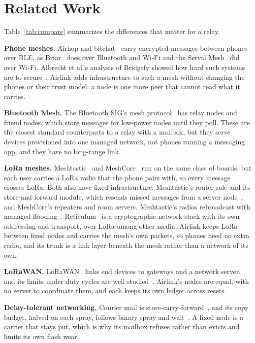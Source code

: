 \documentclass[conference]{IEEEtran}
\begin{document}
\section{Related Work}
\label{sec:related}

Table~\ref{tab:compare} summarizes the differences that matter for a relay.

\textbf{Phone meshes.} Airhop and bitchat~\cite{airhopwp,bitchat} carry encrypted messages between phones over BLE, as Briar~\cite{briar} does over Bluetooth and Wi-Fi and the Serval Mesh~\cite{serval} did over Wi-Fi. Albrecht et al.'s analysis of Bridgefy showed how hard such systems are to secure~\cite{bridgefy}. Airlink adds infrastructure to such a mesh without changing the phones or their trust model: a node is one more peer that cannot read what it carries.

\textbf{Bluetooth Mesh.} The Bluetooth SIG's mesh protocol~\cite{btmesh} has relay nodes and friend nodes, which store messages for low-power nodes until they poll. These are the closest standard counterparts to a relay with a mailbox, but they serve devices provisioned into one managed network, not phones running a messaging app, and they have no long-range link.

\textbf{LoRa meshes.} Meshtastic~\cite{meshtasticintro} and MeshCore~\cite{meshcore} run on the same class of boards, but each user carries a LoRa radio that the phone pairs with, so every message crosses LoRa. Both also have fixed infrastructure: Meshtastic's router role and its store-and-forward module, which resends missed messages from a server node~\cite{meshtasticsf}, and MeshCore's repeaters and room servers. Meshtastic's radios rebroadcast with managed flooding~\cite{meshtastic}. Reticulum~\cite{reticulum} is a cryptographic network stack with its own addressing and transport, over LoRa among other media. Airlink keeps LoRa between fixed nodes and carries the mesh's own packets, so phones need no extra radio, and its trunk is a link layer beneath the mesh rather than a network of its own.

\textbf{LoRaWAN.} LoRaWAN~\cite{lorawan,lorawanrp} links end devices to gateways and a network server, and its limits under duty cycles are well studied~\cite{adelantado2017,bor2016}. Airlink's nodes are equal, with no server to coordinate them, and each keeps its own ledger across resets.

\textbf{Delay-tolerant networking.} Courier mail is store-carry-forward~\cite{fall2003,rfc4838}, and its copy budget, halved on each spray, follows binary spray and wait~\cite{spyropoulos2005}. A fixed node is a carrier that stays put, which is why its mailbox refuses rather than evicts and limits its own flash wear.
\end{document}
